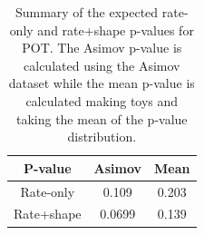 \begin{table}
\centering
\begin{tabular}{| c | c | c |}
\hline
P-value	                                          	& Asimov    	& Mean 		    	\\
\hline
Rate-only                          			& 0.109           	& 0.203                  	\\
Rate+shape                          		& 0.0699          	& 0.139                  	\\
\hline
\end{tabular}
\caption{
Summary of the expected rate-only and rate+shape p-values for 
\TotalPot POT.
The Asimov p-value is calculated using the Asimov dataset while the 
mean p-value is calculated making \NumToysLarge toys and taking the mean 
of the p-value distribution.
}
\label{tab:summary_sensi_lowpot}
\end{table}

%







